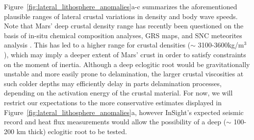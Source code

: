 Figure~\ref{fig:lateral_lithosphere_anomalies}a-c summarizes the aforementioned plausible ranges of lateral crustal variations in density and body wave speeds.
Note that Mars' deep crustal density range has recently been questioned on the basis of in-situ chemical composition analyses, GRS maps, and SNC meteorites analysis \citep{Baratoux2014}. This has led to a higher range for crustal densities ($\sim$ 3100-3600kg/m$^3$), which may imply a deeper extent of Mars' crust in order to satisfy constraints on the moment of inertia. Although a deep eclogitic root would be gravitationally unstable and more easily prone to delamination, the larger crustal viscosities at such colder depths may efficiently delay in parts delamination processes, depending on the activation energy of the crustal material. For now, we will restrict our expectations to the more conservative estimates displayed in  Figure~\ref{fig:lateral_lithosphere_anomalies}a, however InSight's expected seismic record and heat flux measurements would allow the possibility of a deep ($\sim$ 100-200 km thick) eclogitic root to be tested.

